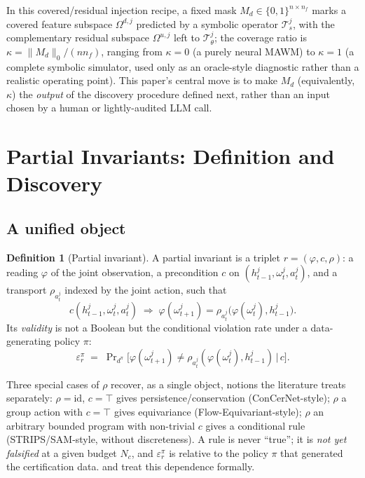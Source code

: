 \documentclass[letterpaper]{article} %
\let\autoref\Cref
\theoremstyle{plain}
\theoremstyle{definition}
\newtheorem{definition}[theorem]{Definition}
\theoremstyle{remark}
\begin{document}
In this covered/residual injection recipe, a fixed mask $M_d\in\{0,1\}^{n\times n_f}$ marks a covered feature subspace $\Omega^{d,j}$ predicted by a symbolic operator $\mathcal{T}^j_s$, with the complementary residual subspace $\Omega^{u,j}$ left to $\mathcal{T}^j_\theta$; the coverage ratio is $\kappa=\|M_d\|_0/(nn_f)$, ranging from $\kappa=0$ (a purely neural MAWM) to $\kappa=1$ (a complete symbolic simulator, used only as an oracle-style diagnostic rather than a realistic operating point). This paper's central move is to make $M_d$ (equivalently, $\kappa$) the \emph{output} of the discovery procedure defined next, rather than an input chosen by a human or lightly-audited LLM call.

\section{Partial Invariants: Definition and Discovery}
\label{sec:invariants}

\subsection{A unified object}
\label{sec:invariant-object}

\begin{definition}[Partial invariant]
  \label{def:invariant}
  A partial invariant is a triplet $r=(\varphi,c,\rho)$: a reading $\varphi$ of the joint observation, a precondition $c$ on $(h^j_{t-1},\omega^j_t,a^j_t)$, and a transport $\rho_{a^j_t}$ indexed by the joint action, such that
  \begin{equation}
    c(h^j_{t-1},\omega^j_t,a^j_t) \;\Longrightarrow\; \varphi(\omega^j_{t+1}) = \rho_{a^j_t}\big(\varphi(\omega^j_t), h^j_{t-1}\big).
  \end{equation}
  Its \emph{validity} is not a Boolean but the conditional violation rate under a data-generating policy $\pi$:
  \begin{equation}
    \label{eq:eps-def}
    \varepsilon^\pi_r \;=\; \Pr\nolimits_{d^\pi}\!\big[\varphi(\omega^j_{t+1}) \neq \rho_{a^j_t}(\varphi(\omega^j_t),h^j_{t-1}) \,\big|\, c\big].
  \end{equation}
\end{definition}
Three special cases of $\rho$ recover, as a single object, notions the literature treats separately: $\rho=\mathrm{id}$, $c=\top$ gives persistence/conservation (ConCerNet-style); $\rho$ a group action with $c=\top$ gives equivariance (Flow-Equivariant-style); $\rho$ an arbitrary bounded program with non-trivial $c$ gives a conditional rule (STRIPS/SAM-style, without discreteness). A rule is never ``true''; it is \emph{not yet falsified} at a given budget $N_c$, and $\varepsilon^\pi_r$ is relative to the policy $\pi$ that generated the certification data. \autoref{thm:t4} and \autoref{thm:t5} treat this dependence formally.
\end{document}
